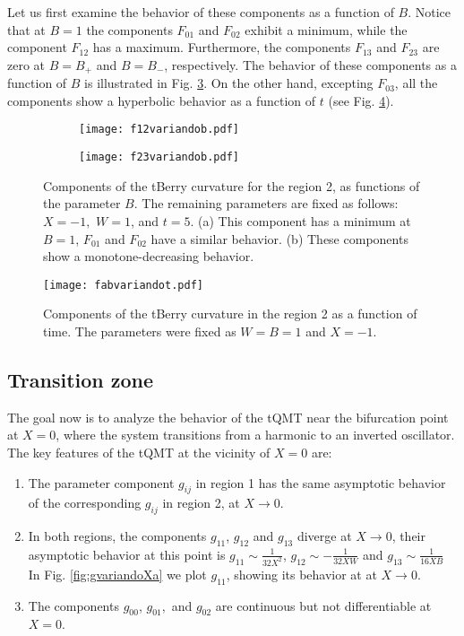 \documentclass[12pt]{iopart}
\begin{document}
Let us first examine the behavior of these components as a function of $ B $.  Notice that at $B=1$ the components $ F_{01} $ and $ F_{02}$ exhibit a minimum, while the component $F_{12}$ has a maximum. Furthermore, the components $ F_{13} $ and $ F_{23}$ are zero at $B=B_{+}$ and $B=B_{-}$, respectively. The behavior of these components as a function of $B$ is illustrated in Fig. \ref{fig:fvariandob}. On the other hand, excepting $F_{03}$, all the components show a hyperbolic behavior as a function of $t$ (see Fig. \ref{fig9}).


\begin{figure}[H]
  \centering
  \begin{subfigure}{0.45\linewidth}
    \texttt{[image: f12variandob.pdf]}
    \caption{}
    \label{fig:fvariandoba}
  \end{subfigure}
  \begin{subfigure}{0.45\linewidth}
    \texttt{[image: f23variandob.pdf]}  
    \caption{}
    \label{fig:fvariandobb}  
  \end{subfigure}
  \captionsetup{font=small} 
  \caption{\justifying Components of the tBerry curvature for the region 2, as functions of the parameter $B$. The remaining parameters are fixed as follows: $X=-1,$ $W=1$, and $t=5$. (a) This component has a minimum at $B=1$, $F_{01}$ and $F_{02}$ have a similar behavior. (b) These components show a monotone-decreasing behavior.}
    \label{fig:fvariandob}
\end{figure}


\begin{figure}[H]
    \centering
    \texttt{[image: fabvariandot.pdf]}
  \captionsetup{font=small} 
    \caption{\justifying Components of the tBerry curvature in the region 2 as a function of time. The parameters were fixed as $W=B=1$ and $X=-1$.}
    \label{fig9}
\end{figure}

\subsection{Transition zone}

The goal now is to analyze the behavior of the tQMT near the bifurcation point at $X=0$, where the system transitions from a harmonic to an inverted oscillator. The key features of the tQMT at the vicinity of $X=0$ are:

\begin{enumerate}
    \item The parameter component $g_{ij}$ in region 1 has the same asymptotic behavior of the corresponding $g_{ij}$ in region 2, at $X\to 0$.
    \item In both regions, the components $g_{11}$, $g_{12}$ and $g_{13}$ diverge at $X \to 0$,  their asymptotic behavior at this point is $g_{11} \sim \frac{1}{32X^2}$, $g_{12} \sim -\frac{1}{32XW}$ and $g_{13} \sim \frac{1}{16XB}$ In Fig. \ref{fig:gvariandoXa}  we plot $g_{11}$, showing its behavior at at $X \to 0$.
    \item The components $g_{00}$, $g_{01},$ and $g_{02}$ are continuous but not differentiable at $X=0$.
\end{enumerate}
\end{document}

